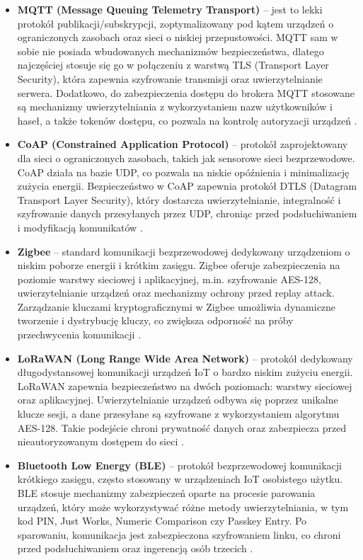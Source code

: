 \begin{itemize}
    \item \textbf{MQTT (Message Queuing Telemetry Transport)} – jest to lekki protokół publikacji/subskrypcji, zoptymalizowany pod kątem urządzeń o ograniczonych zasobach oraz sieci o niskiej przepustowości. MQTT sam w sobie nie posiada wbudowanych mechanizmów bezpieczeństwa, dlatego najczęściej stosuje się go w połączeniu z warstwą TLS (Transport Layer Security), która zapewnia szyfrowanie transmisji oraz uwierzytelnianie serwera. Dodatkowo, do zabezpieczenia dostępu do brokera MQTT stosowane są mechanizmy uwierzytelniania z wykorzystaniem nazw użytkowników i haseł, a także tokenów dostępu, co pozwala na kontrolę autoryzacji urządzeń \cite{light2017mqtt}.

    \item \textbf{CoAP (Constrained Application Protocol)} – protokół zaprojektowany dla sieci o ograniczonych zasobach, takich jak sensorowe sieci bezprzewodowe. CoAP działa na bazie UDP, co pozwala na niskie opóźnienia i minimalizację zużycia energii. Bezpieczeństwo w CoAP zapewnia protokół DTLS (Datagram Transport Layer Security), który dostarcza uwierzytelnianie, integralność i szyfrowanie danych przesyłanych przez UDP, chroniąc przed podsłuchiwaniem i modyfikacją komunikatów \cite{shelby2014constrained}.

    \item \textbf{Zigbee} – standard komunikacji bezprzewodowej dedykowany urządzeniom o niskim poborze energii i krótkim zasięgu. Zigbee oferuje zabezpieczenia na poziomie warstwy sieciowej i aplikacyjnej, m.in. szyfrowanie AES-128, uwierzytelnianie urządzeń oraz mechanizmy ochrony przed replay attack. Zarządzanie kluczami kryptograficznymi w Zigbee umożliwia dynamiczne tworzenie i dystrybucję kluczy, co zwiększa odporność na próby przechwycenia komunikacji \cite{zigbeeAlliance}.

    \item \textbf{LoRaWAN (Long Range Wide Area Network)} – protokół dedykowany długodystansowej komunikacji urządzeń IoT o bardzo niskim zużyciu energii. LoRaWAN zapewnia bezpieczeństwo na dwóch poziomach: warstwy sieciowej oraz aplikacyjnej. Uwierzytelnianie urządzeń odbywa się poprzez unikalne klucze sesji, a dane przesyłane są szyfrowane z wykorzystaniem algorytmu AES-128. Takie podejście chroni prywatność danych oraz zabezpiecza przed nieautoryzowanym dostępem do sieci \cite{adelantado2017understanding}.

    \item \textbf{Bluetooth Low Energy (BLE)} – protokół bezprzewodowej komunikacji krótkiego zasięgu, często stosowany w urządzeniach IoT osobistego użytku. BLE stosuje mechanizmy zabezpieczeń oparte na procesie parowania urządzeń, który może wykorzystywać różne metody uwierzytelniania, w tym kod PIN, Just Works, Numeric Comparison czy Passkey Entry. Po sparowaniu, komunikacja jest zabezpieczona szyfrowaniem linku, co chroni przed podsłuchiwaniem oraz ingerencją osób trzecich \cite{bleSpec}.

\end{itemize}

